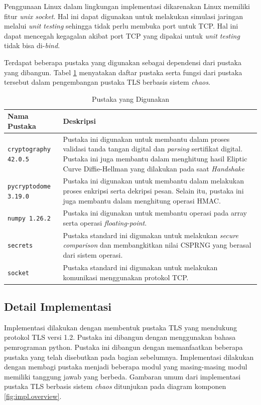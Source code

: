 Penggunaan Linux dalam lingkungan implementasi dikarenakan Linux memiliki fitur \emph{unix socket}. Hal ini dapat digunakan untuk melakukan simulasi jaringan melalui \emph{unit testing} sehingga tidak perlu membuka port untuk TCP. Hal ini dapat mencegah kegagalan akibat port TCP yang dipakai untuk \emph{unit testing} tidak bisa di-\emph{bind}.

Terdapat beberapa pustaka yang digunakan sebagai dependensi dari pustaka yang dibangun. Tabel \ref{tab:impl.lib} menyatakan daftar pustaka serta fungsi dari pustaka tersebut dalam pengembangan pustaka TLS berbasis sistem \emph{chaos}.

\begin{table}[!h]
  \centering
  \caption{Pustaka yang Digunakan} \label{tab:impl.lib}
  \begin{tabular}{|p{4cm}|p{9cm}|}
    \hline
    \textbf{Nama Pustaka} & \textbf{Deskripsi} \\ \hline
    \texttt{cryptography 42.0.5} & Pustaka ini digunakan untuk membantu dalam proses validasi tanda tangan digital dan \emph{parsing} sertifikat digital. Pustaka ini juga membantu dalam menghitung hasil Eliptic Curve Diffie-Hellman yang dilakukan pada saat \emph{Handshake} \\ \hline
    \texttt{pycryptodome 3.19.0} & Pustaka ini digunakan untuk membantu dalam melakukan proses enkripsi serta dekripsi pesan. Selain itu, pustaka ini juga membantu dalam menghitung operasi HMAC. \\ \hline
    \texttt{numpy 1.26.2} & Pustaka ini digunakan untuk membantu operasi pada array serta operasi \emph{floating-point}.\\ \hline
    \texttt{secrets} & Pustaka standard ini digunakan untuk melakukan \emph{secure comparison} dan membangkitkan nilai CSPRNG yang berasal dari sistem operasi. \\ \hline
    \texttt{socket} & Pustaka standard ini digunakan untuk melakukan komunikasi menggunakan protokol TCP.\\ \hline
  \end{tabular}
\end{table}

\subsection{Detail Implementasi}

Implementasi dilakukan dengan membentuk pustaka TLS yang mendukung protokol TLS versi 1.2. Pustaka ini dibangun dengan menggunakan bahasa pemrograman python. Pustaka ini dibangun dengan memanfaatkan beberapa pustaka yang telah disebutkan pada bagian sebelumnya. Implementasi dilakukan dengan membagi pustaka menjadi beberapa modul yang masing-masing modul memiliki tanggung jawab yang berbeda. Gambaran umum dari implementasi pustaka TLS berbasis sistem \emph{chaos} ditunjukan pada diagram komponen \ref{fig:impl.overview}.

